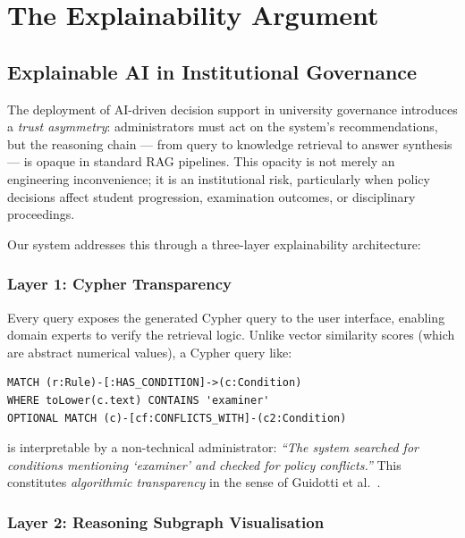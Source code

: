 \section{The Explainability Argument}
\label{sec:xai}

\subsection{Explainable AI in Institutional Governance}

The deployment of AI-driven decision support in university governance introduces a \textit{trust asymmetry}: administrators must act on the system's recommendations, but the reasoning chain — from query to knowledge retrieval to answer synthesis — is opaque in standard RAG pipelines. This opacity is not merely an engineering inconvenience; it is an institutional risk, particularly when policy decisions affect student progression, examination outcomes, or disciplinary proceedings.

Our system addresses this through a three-layer explainability architecture:

\subsubsection{Layer 1: Cypher Transparency}

Every query exposes the generated Cypher query to the user interface, enabling domain experts to verify the retrieval logic. Unlike vector similarity scores (which are abstract numerical values), a Cypher query like:

\begin{verbatim}
MATCH (r:Rule)-[:HAS_CONDITION]->(c:Condition)
WHERE toLower(c.text) CONTAINS 'examiner'
OPTIONAL MATCH (c)-[cf:CONFLICTS_WITH]-(c2:Condition)
\end{verbatim}

\noindent is interpretable by a non-technical administrator: \textit{``The system searched for conditions mentioning `examiner' and checked for policy conflicts.''} This constitutes \textit{algorithmic transparency} in the sense of Guidotti et al.~\cite{guidotti2018survey}.

\subsubsection{Layer 2: Reasoning Subgraph Visualisation}

